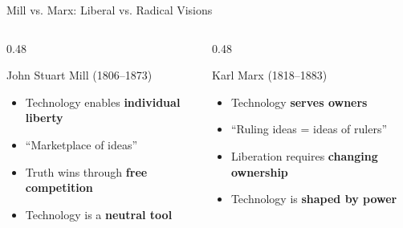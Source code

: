 \documentclass[aspectratio=169]{beamer}
\begin{document}
\begin{frame}{Mill vs. Marx: Liberal vs. Radical Visions}
\begin{columns}
\begin{column}{0.48\textwidth}
\begin{block}{John Stuart Mill (1806--1873)}
\begin{itemize}
  \item Technology enables \textbf{individual liberty}
  \item ``Marketplace of ideas''
  \item Truth wins through \textbf{free competition}
  \item Technology is a \textbf{neutral tool}
\end{itemize}
\end{block}
\end{column}

\begin{column}{0.48\textwidth}
\begin{alertblock}{Karl Marx (1818--1883)}
\begin{itemize}
  \item Technology \textbf{serves owners}
  \item ``Ruling ideas = ideas of rulers''
  \item Liberation requires \textbf{changing ownership}
  \item Technology is \textbf{shaped by power}
\end{itemize}
\end{alertblock}
\end{column}
\end{columns}

\vspace{0.5em}
\end{frame}
\end{document}
